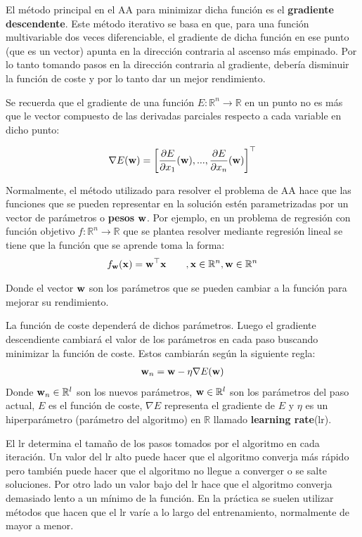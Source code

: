 El método principal en el AA para minimizar dicha función es el \textbf{gradiente descendente}. Este método iterativo se basa en que, para una función multivariable dos veces diferenciable, el gradiente de dicha función en ese punto (que es un vector) apunta en la dirección contraria al ascenso más empinado. Por lo tanto tomando pasos en la dirección contraria al gradiente, debería disminuir la función de coste y por lo tanto dar un mejor rendimiento.


Se recuerda que el gradiente de una función $E:\mathbb{R}^n \rightarrow \mathbb{R}$ en un punto no es más que le vector compuesto de las derivadas parciales respecto a cada variable en dicho punto:

\begin{align*}
\nabla E(\textnormal{\textbf{w}}) = \left[ \frac{\partial E}{\partial x_1}(\textnormal{\textbf{w}}),...,\frac{\partial E}{\partial x_n}(\textnormal{\textbf{w}}) \right]^\top
\end{align*}


Normalmente, el método utilizado para resolver el problema de AA hace que las funciones que se pueden representar en la solución estén parametrizadas por un vector de parámetros o \textbf{pesos} $\textnormal{\textbf{w}}$. Por ejemplo, en un problema de regresión con función objetivo $f:\mathbb{R}^n \rightarrow \mathbb{R}$ que se plantea resolver mediante regresión lineal se tiene que la función que se aprende toma la forma: 
\begin{align*}
f_{\textnormal{\textbf{w}}}(\textnormal{\textbf{x}}) = \textnormal{\textbf{w}}^\top \textnormal{\textbf{x}} \quad \quad , \textnormal{\textbf{x}} \in \mathbb{R}^n, \textnormal{\textbf{w}} \in \mathbb{R}^n
\end{align*}
 
Donde el vector $\textnormal{\textbf{w}}$ son los parámetros que se pueden cambiar a la función para mejorar su rendimiento.

La función de coste dependerá de dichos parámetros. Luego el gradiente descendiente cambiará el valor de los parámetros en cada paso buscando minimizar la función de coste. Estos cambiarán según la siguiente regla:
\begin{align*}
\textnormal{\textbf{w}}_n = \textnormal{\textbf{w}} - \eta \nabla E(\textnormal{\textbf{w}})
\end{align*} 
Donde $\textnormal{\textbf{w}}_n\in\mathbb{R}^l$ son los nuevos parámetros, $\textnormal{\textbf{w}}\in\mathbb{R}^l$ son los parámetros del paso actual, $E$ es el función de coste, $\nabla E$ representa el gradiente de $E$ y $\eta$ es un hiperparámetro (parámetro del algoritmo) en $\mathbb{R}$ llamado \textbf{learning rate}(lr).

El lr determina el tamaño de los pasos tomados por el algoritmo en cada iteración. Un valor del lr alto puede hacer que	el algoritmo converja más rápido pero también puede hacer que el algoritmo no llegue a converger o se salte soluciones. Por otro lado un valor bajo del lr hace que el algoritmo converja demasiado lento a un mínimo de la función. En la práctica se suelen utilizar métodos que hacen que el lr varíe a lo largo del entrenamiento, normalmente de mayor a menor.


